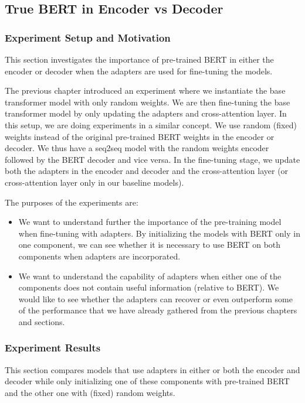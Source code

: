 \subsection{True BERT in Encoder vs Decoder}
\label{sec:pospre}
\subsubsection{Experiment Setup and Motivation}
This section investigates the importance of pre-trained BERT in either the encoder or decoder when the adapters are used for fine-tuning the models.

The previous chapter introduced an experiment where we instantiate the base transformer model with only random weights. We are then fine-tuning the base transformer model by only updating the adapters and cross-attention layer. In this setup, we are doing experiments in a similar concept. We use random (fixed) weights instead of the original pre-trained BERT weights in the encoder or decoder. We thus have a seq2seq model with the random weights encoder followed by the BERT decoder and vice versa. In the fine-tuning stage, we update both the adapters in the encoder and decoder and the cross-attention layer (or cross-attention layer only in our baseline models).

The purposes of the experiments are:
\begin{itemize}
    \item We want to understand further the importance of the pre-training model when fine-tuning with adapters. By initializing the models with BERT only in one component, we can see whether it is necessary to use BERT on both components when adapters are incorporated.
    \item We want to understand the capability of adapters when either one of the components does not contain useful information (relative to BERT). We would like to see whether the adapters can recover or even outperform some of the performance that we have already gathered from the previous chapters and sections.
\end{itemize}

\subsubsection{Experiment Results}
This section compares models that use adapters in either or both the encoder and decoder while only initializing one of these components with pre-trained BERT and the other one with (fixed) random weights.

